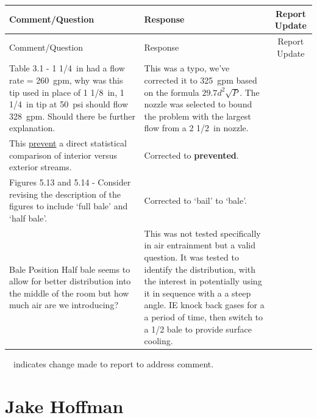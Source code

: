 \documentclass[12pt,oneside]{book}
\begin{document}
\begin{landscape}
\begin{longtable}{|L{4in}|L{3.75in}|c|}
		\hline
		Comment/Question & Response & Report Update \\ 
		\toprule[1.0pt] \endfirsthead
		\hline
		Comment/Question & Response & Report Update \\ 
		\toprule[1.0pt] \endhead
		\hline
 		Table 3.1 - 1 1/4~in had a flow rate = 260~gpm, why was this tip used in place of 1 1/8~in, 1 1/4~in tip at 50~psi should flow 328~gpm. Should there be further explanation. &
 		This was a typo, we've corrected it to 325~gpm based on the formula $29.7d^2\sqrt{P}$. The nozzle was selected to bound the problem with the largest flow from a 2 1/2~in nozzle. & \\

 		\hline
 		This \ul{prevent} a direct statistical comparison of interior versus exterior streams. &
 		Corrected to \textbf{prevented}. & \checkmark \\

 		\hline
 		Figures 5.13 and 5.14 - Consider revising the description of the figures to include ‘full bale’ and ‘half bale’. &
 		Corrected to `bail' to `bale'. & \checkmark \\

 		\hline
 		Bale Position Half bale seems to allow for better distribution into the middle of the room but how much air are we introducing? & 
 		This was not tested specifically in air entrainment but a valid question. It was tested to identify the distribution, with the interest in potentially using it in sequence with a a steep angle. IE knock back gases for a a period of time, then switch to a 1/2 bale to provide surface cooling. & \\

 		\hline
\end{longtable}
\checkmark~~indicates change made to report to address comment.

\newpage

\section{Jake Hoffman}
\begin{longtable}{|L{4in}|L{3.75in}|c|}


\end{longtable}
\end{landscape}
\end{document}
